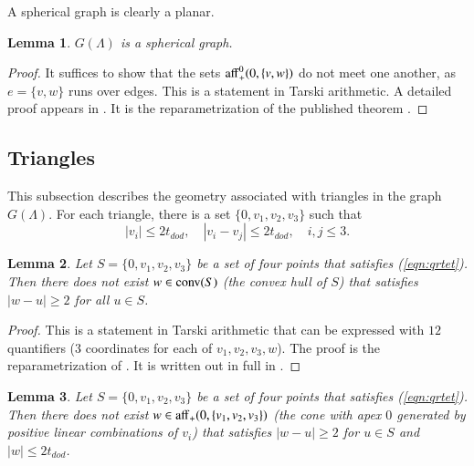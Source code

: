 \documentclass{article} %
\newtheorem{lemma}{Lemma}[subsection]
\begin{document}
A spherical graph is clearly a planar.

\begin{lemma}\label{lemma:planar}  
$G(\Lambda)$ is a spherical graph.
\end{lemma}

\begin{proof} 
  It suffices to show that the sets
  ${\operatorname{aff}}^0_+(0,\{v,w\})$ do not meet one another, as $e=\{v,w\}$
  runs over edges.  This is a statement in Tarski arithmetic.
  A detailed proof appears in \cite[Lemma~3.2]{Hales:2002:Dodec}.  
  It is the reparametrization
  of the published theorem \cite[Lemma~3.10]{Hales:1997:DCG}.
\end{proof}


\subsection{Triangles}

This subsection describes the geometry associated with
triangles in the graph $G(\Lambda)$.  For each triangle,
there is a set $\{0,v_1,v_2,v_3\}$ such that
\begin{equation}\label{eqn:qrtet}
  |v_i| \le 2t_{dod},\quad |v_i-v_j | \le 2 t_{dod},\quad i,j\le 3.
\end{equation}

\begin{lemma} Let $S=\{0,v_1,v_2,v_3\}$ be a set of four points
that satisfies (\ref{eqn:qrtet}).  Then
there does not exist $w\in{\operatorname{conv}}(S)$
(the convex hull of $S$) that satisfies $|w-u|\ge 2$ for all
$u\in S$.
\end{lemma}

\begin{proof} This is a statement in Tarski arithmetic that can be
expressed with $12$ quantifiers ($3$ coordinates for each of
$v_1,v_2,v_3,w$). The proof is the reparametrization of
\cite[Lemma~4.15]{Hales:2006:DCG}. It is written out in full in
\cite[Lemma~3.3]{Hales:2002:Dodec}.
\end{proof}

\begin{lemma}\label{lemma:enclosed} 
Let $S=\{0,v_1,v_2,v_3\}$ be a set of four points
that satisfies (\ref{eqn:qrtet}).  Then
there does not exist $w\in{\operatorname{aff}}_+(0,\{v_1,v_2,v_3\})$
(the cone with apex $0$ 
generated by positive linear combinations of $v_i$) 
that satisfies $|w-u|\ge 2$ for 
$u\in S$ and $|w|\le 2t_{dod}$.
\end{lemma}
\end{document}
